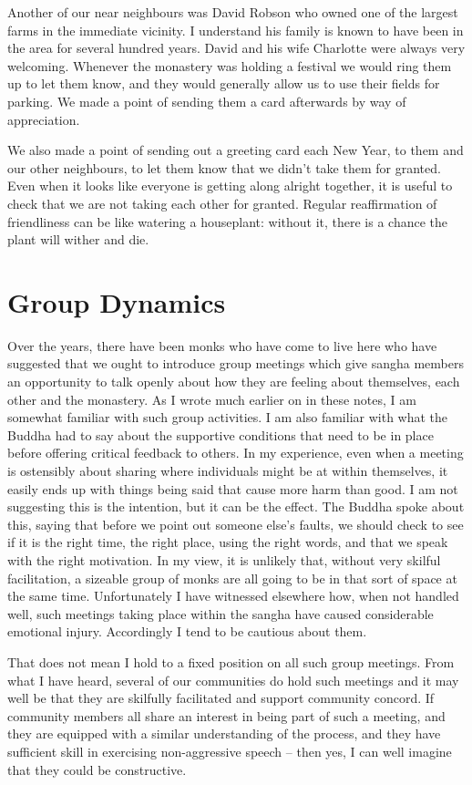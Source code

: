 Another of our near neighbours was David Robson who owned one of the
largest farms in the immediate vicinity. I understand his family is
known to have been in the area for several hundred years. David and his
wife Charlotte were always very welcoming. Whenever the monastery was
holding a festival we would ring them up to let them know, and they
would generally allow us to use their fields for parking. We made a
point of sending them a card afterwards by way of appreciation.

We also made a point of sending out a greeting card each New Year, to
them and our other neighbours, to let them know that we didn't take them
for granted. Even when it looks like everyone is getting along alright
together, it is useful to check that we are not taking each other for
granted. Regular reaffirmation of friendliness can be like watering a
houseplant: without it, there is a chance the plant will wither and die.

\section{Group Dynamics}

Over the years, there have been monks who have come to live here who
have suggested that we ought to introduce group meetings which give
sangha members an opportunity to talk openly about how they are feeling
about themselves, each other and the monastery. As I wrote much earlier
on in these notes, I am somewhat familiar with such group activities. I
am also familiar with what the Buddha had to say about the supportive
conditions that need to be in place before offering critical feedback to
others. In my experience, even when a meeting is ostensibly about
sharing where individuals might be at within themselves, it easily ends
up with things being said that cause more harm than good. I am not
suggesting this is the intention, but it can be the effect. The Buddha
spoke about this, saying that before we point out someone else's faults,
we should check to see if it is the right time, the right place, using
the right words, and that we speak with the right motivation. In my
view, it is unlikely that, without very skilful facilitation, a sizeable
group of monks are all going to be in that sort of space at the same
time. Unfortunately I have witnessed elsewhere how, when not handled
well, such meetings taking place within the sangha have caused
considerable emotional injury. Accordingly I tend to be cautious about
them.

That does not mean I hold to a fixed position on all such group
meetings. From what I have heard, several of our communities do hold
such meetings and it may well be that they are skilfully facilitated and
support community concord. If community members all share an interest in
being part of such a meeting, and they are equipped with a similar
understanding of the process, and they have sufficient skill in
exercising non-aggressive speech -- then yes, I can well imagine that
they could be constructive.

